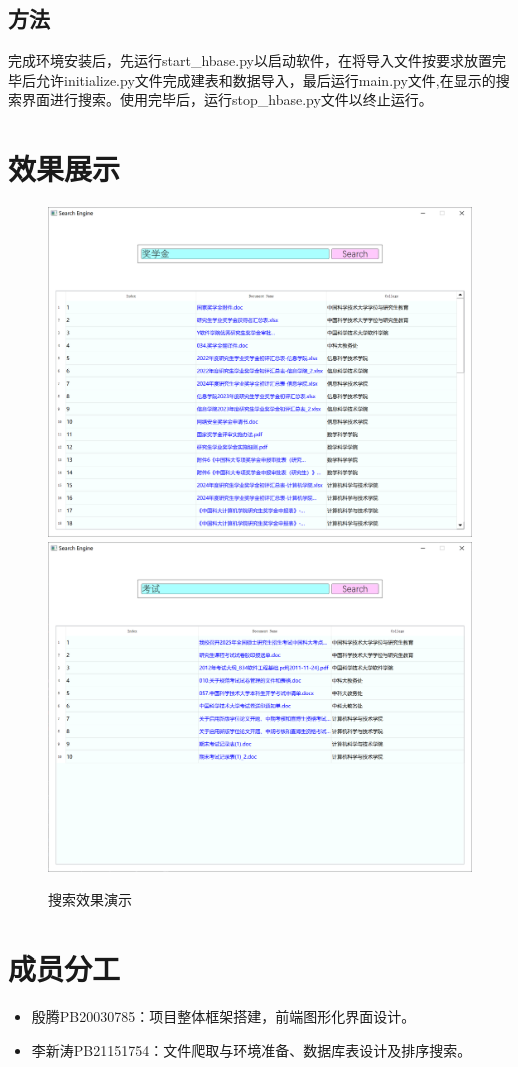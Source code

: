 \documentclass{article}
\begin{document}
	\subsection{方法}
	完成环境安装后，先运行start\_hbase.py以启动软件，在将导入文件按要求放置完毕后允许initialize.py文件完成建表和数据导入，最后运行main.py文件,在显示的搜索界面进行搜索。使用完毕后，运行stop\_hbase.py文件以终止运行。
	
	
	\section{效果展示}
	\begin{figure}[h]
		\centering
		\includegraphics[width=0.4\linewidth]{screenshot001}
		\includegraphics[width=0.4\linewidth]{screenshot002}
		\caption{搜索效果演示}
		\label{fig:screenshot001}
	\end{figure}
	
	\section{成员分工}
	\begin{itemize}
		\item 殷腾PB20030785：项目整体框架搭建，前端图形化界面设计。
		\item 李新涛PB21151754：文件爬取与环境准备、数据库表设计及排序搜索。
	\end{itemize}
	
\end{document}
